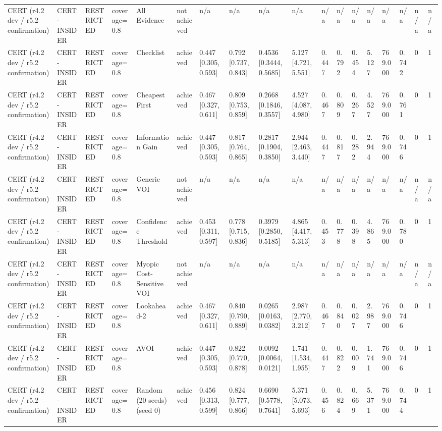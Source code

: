 \begin{table}[!ht]
{\begin{tabular}{llllllllllllllllll}
CERT (r4.2 dev / r5.2 confirmation) & CERT-INSIDER & RESTRICTED & coverage=0.8 & All Evidence & not achieved & n/a & n/a & n/a & n/a & n/a & n/a & n/a & n/a & n/a & n/a & n/a & n/a \\
CERT (r4.2 dev / r5.2 confirmation) & CERT-INSIDER & RESTRICTED & coverage=0.8 & Checklist & achieved & 0.447 [0.305, 0.593] & 0.792 [0.737, 0.843] & 0.4536 [0.3444, 0.5685] & 5.127 [4.721, 5.551] & 0.447 & 0.792 & 0.454 & 5.127 & 769.000 & 0.742 & 0 & 1 \\
CERT (r4.2 dev / r5.2 confirmation) & CERT-INSIDER & RESTRICTED & coverage=0.8 & Cheapest First & achieved & 0.467 [0.327, 0.611] & 0.809 [0.753, 0.859] & 0.2668 [0.1846, 0.3557] & 4.527 [4.087, 4.980] & 0.467 & 0.809 & 0.267 & 4.527 & 769.000 & 0.761 & 0 & 1 \\
CERT (r4.2 dev / r5.2 confirmation) & CERT-INSIDER & RESTRICTED & coverage=0.8 & Information Gain & achieved & 0.447 [0.305, 0.593] & 0.817 [0.764, 0.865] & 0.2817 [0.1904, 0.3850] & 2.944 [2.463, 3.440] & 0.447 & 0.817 & 0.282 & 2.944 & 769.000 & 0.746 & 0 & 1 \\
CERT (r4.2 dev / r5.2 confirmation) & CERT-INSIDER & RESTRICTED & coverage=0.8 & Generic VOI & not achieved & n/a & n/a & n/a & n/a & n/a & n/a & n/a & n/a & n/a & n/a & n/a & n/a \\
CERT (r4.2 dev / r5.2 confirmation) & CERT-INSIDER & RESTRICTED & coverage=0.8 & Confidence Threshold & achieved & 0.453 [0.311, 0.597] & 0.778 [0.715, 0.836] & 0.3979 [0.2850, 0.5185] & 4.865 [4.417, 5.313] & 0.453 & 0.778 & 0.398 & 4.865 & 769.000 & 0.780 & 0 & 1 \\
CERT (r4.2 dev / r5.2 confirmation) & CERT-INSIDER & RESTRICTED & coverage=0.8 & Myopic Cost-Sensitive VOI & not achieved & n/a & n/a & n/a & n/a & n/a & n/a & n/a & n/a & n/a & n/a & n/a & n/a \\
CERT (r4.2 dev / r5.2 confirmation) & CERT-INSIDER & RESTRICTED & coverage=0.8 & Lookahead-2 & achieved & 0.467 [0.327, 0.611] & 0.840 [0.790, 0.889] & 0.0265 [0.0163, 0.0382] & 2.987 [2.770, 3.212] & 0.467 & 0.840 & 0.027 & 2.987 & 769.000 & 0.746 & 0 & 1 \\
CERT (r4.2 dev / r5.2 confirmation) & CERT-INSIDER & RESTRICTED & coverage=0.8 & AVOI & achieved & 0.447 [0.305, 0.593] & 0.822 [0.770, 0.878] & 0.0092 [0.0064, 0.0121] & 1.741 [1.534, 1.955] & 0.447 & 0.822 & 0.009 & 1.741 & 769.000 & 0.746 & 0 & 1 \\
CERT (r4.2 dev / r5.2 confirmation) & CERT-INSIDER & RESTRICTED & coverage=0.8 & Random (20 seeds) (seed 0) & achieved & 0.456 [0.313, 0.599] & 0.824 [0.777, 0.866] & 0.6690 [0.5778, 0.7641] & 5.371 [5.073, 5.693] & 0.456 & 0.824 & 0.669 & 5.371 & 769.000 & 0.744 & 0 & 1 \\

\end{tabular}}
\end{table}
